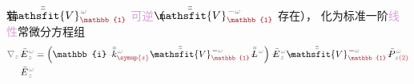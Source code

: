 若 $\xint{\mathcolor{gray}{-}}{25}{\bar{\bar{\mathsfit{V}}}}^{\;\! \mathcolor{gray}{\omega}}_{\textcolor{Maroon}{\mathbb{1}}}$ \textcolor{Plum}{可逆}（ $\xint{\mathcolor{gray}{-}}{25}{\bar{\bar{\mathsfit{V}}}}^{\;\! - \mathcolor{gray}{\omega}}_{\textcolor{Maroon}{\mathbb{1}}}$ 存在）， 化为标准一阶\textcolor{Plum}{线性}常微分方程组
\begin{align}
	\mathcolor{gray}{\nabla_z} \xint{\mathcolor{gray}{-}}{295}{\bar{E}}^{\;\!\mathcolor{gray}{\omega}}_{\;\! \mathcolor{gray}{z}}
	&= \left( \mathbb{i} \xint{\begin{smallmatrix} ~ \\ {}^{}_{\mathcolor{gray}{-}} \\ ~ \end{smallmatrix}}{15}{\bar{\bar{k}}}_{\textcolor{Maroon}{\symup{z}}}^{\;\! \mathcolor{gray}{\omega}} - \xint{\mathcolor{gray}{-}}{25}{\bar{\bar{\mathsfit{V}}}}^{\;\! - \mathcolor{gray}{\omega}}_{\textcolor{Maroon}{\mathbb{1}}} \xint{\mathcolor{gray}{-}}{32}{\bar{\bar{L}}}^{\;\! \mathcolor{gray}{\omega}} \right) \xint{\mathcolor{gray}{-}}{295}{\bar{E}}^{\;\!\mathcolor{gray}{\omega}}_{\;\! \mathcolor{gray}{z}} - \xint{\mathcolor{gray}{-}}{25}{\bar{\bar{\mathsfit{V}}}}^{\;\! - \mathcolor{gray}{\omega}}_{\textcolor{Maroon}{\mathbb{1}}} \xint{\mathcolor{gray}{-}}{30}{\bar{P}}^{\;\! \mathcolor{gray}{\omega}}_{\;\! \mathcolor{gray}{z} \textcolor{Maroon}{(2)}} \label{eq:simplify6-SVA-E'-V_1nonsingular} \\
	\xint{\mathcolor{gray}{-}}{295}{\bar{E}}^{\;\!\mathcolor{gray}{\omega}}_{\;\! \mathcolor{gray}{z}}

\end{align}
